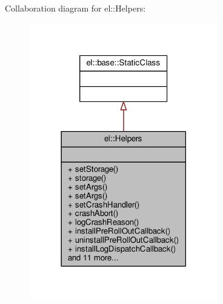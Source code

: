 Collaboration diagram for el\+:\+:Helpers\+:
\nopagebreak
\begin{figure}[H]
\begin{center}
\leavevmode
\includegraphics[width=234pt]{dc/d80/classel_1_1Helpers__coll__graph}
\end{center}
\end{figure}
